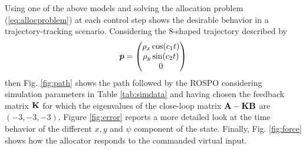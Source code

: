 \vspace{3mm}

Using one of the above models and solving the allocation problem (\ref{eq:allocproblem}) at each control step shows the desirable behavior in a trajectory-tracking scenario. Considering the 8-shaped trajectory described by
\[ \boldsymbol{p} =
\begin{pmatrix}
    \rho_{x} \cos(c_{1} t) \\ \rho_{y} \sin(c_{2}t) \\ 0
\end{pmatrix}
\]
then Fig. \ref{fig:path} shows the path followed by the ROSPO considering simulation parameters in Table \ref{tab:simdata} and having chosen the feedback matrix $\mathbf{K}$ for which the eigenvalues of the close-loop matrix $\mathbf{A} - \mathbf{KB}$ are $(-3,-3,-3)$. Figure \ref{fig:error} reports a more detailed look at the time behavior of the different $x, y$ and $\psi$ component of the state. Finally, Fig. \ref{fig:force} shows how the allocator responds to the commanded virtual input.

